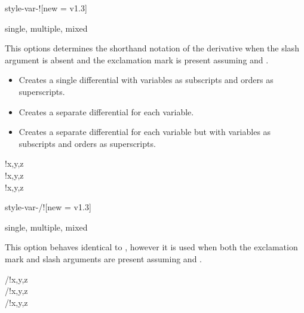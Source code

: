 \begin{option}{style-var-!}[new = v1.3]
	\begin{values}[default = multiple]
		single, multiple, mixed
	\end{values}
	This options determines the shorthand notation of the derivative when the slash argument is absent and the exclamation mark is present assuming  and .
	\begin{itemize}[widest = {}, leftmargin =*]
		\item[\val{single}] Creates a single differential with variables as subscripts and orders as superscripts.
		\item[\val{multiple}] Creates a separate differential for each variable.
		\item[\val{mixed}] Creates a separate differential for each variable but with variables as subscripts and orders as superscripts.
	\end{itemize}
	\begin{example}
		!{x,y,z} \\
		!{x,y,z} \\
		!{x,y,z}
	\end{example}
\end{option}

\begin{option}{style-var-/!}[new = v1.3]
	\begin{values}[default = single]
		single, multiple, mixed
	\end{values}
	This option behaves identical to , however it is used when both the exclamation mark and slash arguments are present assuming  and \keyval{switch-!}{false}.
	\begin{example}
		/!{x,y,z} \\
		/!{x,y,z} \\
		/!{x,y,z}
	\end{example}
\end{option}

